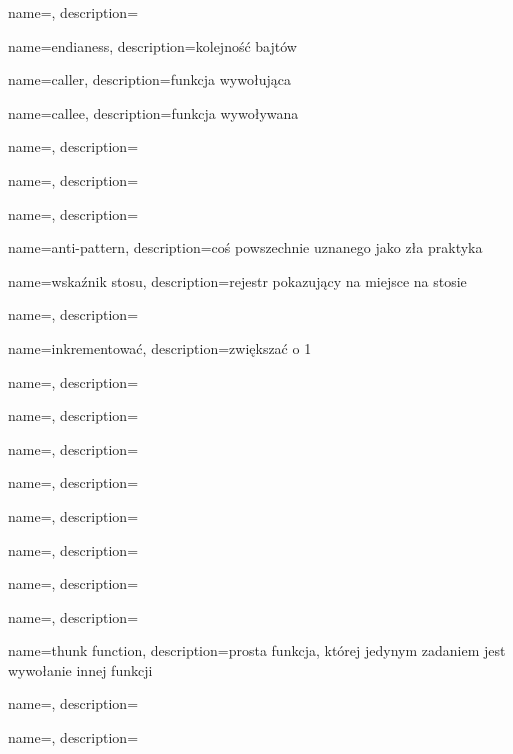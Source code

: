 {
  name={\PLph},
  description={\PLph}
}

{
  name={endianess},
  description={kolejność bajtów}
}

{
  name={caller},
  description={funkcja wywołująca}
}

{
  name={callee},
  description={funkcja wywoływana}
}

{
  name={\PLph},
  description={\PLph}
}

{
  name={\PLph},
  description={\PLph}
}

{
  name={\PLph},
  description={\PLph}
}

{
  name={anti-pattern},
  description={coś powszechnie uznanego jako zła praktyka}
}

{
  name=wskaźnik stosu,
  description={rejestr pokazujący na miejsce na stosie}
}

{
  name={\PLph},
  description={\PLph}
}

{
  name={inkrementować},
  description={zwiększać o 1}
}

{
  name={\PLph},
  description={\PLph}
}

{
  name={\PLph},
  description={\PLph}
}

{
  name={\PLph},
  description={\PLph}
}

{
  name={\PLph},
  description={\PLph}
}

{
  name={\PLph},
  description={\PLph}
}

{
  name={\PLph},
  description={\PLph}
}

{
  name={\PLph},
  description={\PLph}
} 

{
  name={\PLph},
  description={\PLph}
}

{
  name={thunk function},
  description={prosta funkcja, której jedynym zadaniem jest wywołanie innej funkcji}
}

{
  name={\PLph},
  description={\PLph}
}

{
  name={\PLph},
  description={\PLph}
}

